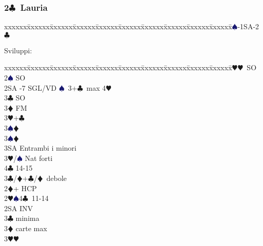 \documentclass[a4paper,italian]{article}
\newcommand{\BC}{\textcolor{OliveGreen}{$\clubsuit$}}
\newcommand{\BD}{\textcolor{RedOrange}{$\vardiamondsuit$}}
\newcommand{\BH}{\textcolor{Red2}{$\varheartsuit${}}}
\newcommand{\BS}{\textcolor{MidnightBlue}{$\spadesuit${}}}
\newcommand{\pdfc}{\texorpdfstring{\BC{}}{C}}
\newenvironment{bidtable}
{\begin{tabbing}

    xxxxxx\=xxxxxx\=xxxxxx\=xxxxxx\=xxxxxx\=xxxxxx\=xxxxxx\=xxxxxx\=xxxxxx\=xxxxxx\=\kill}
{\end{tabbing} }%
\begin{document}
\begin{multicols}{2}
                                        \subsubsection{2\pdfc\ Lauria}
                                        \begin{bidtable}
                                            1\BS-1SA-2\BC
                                        \end{bidtable}

                                        Sviluppi:

                                        \begin{bidtable}
                                            2\BH {}\BH\ SO\\
                                            2\BS \> SO\\
                                            2SA -7 SGL/VD \BS\ 3+\BC\ max 4\BH \+\\
                                            3\BC \> SO\\
                                            3\BD \> FM\+\\
                                            3\BH {}+\BC \+\\
                                            3\BS {}\BD \-\\
                                            3\BS {}\BD \\
                                            3SA \> Entrambi i minori\-\\
                                            3\BH/\BS \> Nat forti\\
                                            4\BC {} 14-15\-\\
                                            3\BC/\BD {}+\BC /\BD\ debole\\
                                            2\BD {}+ HCP\+\\
                                            2\BH {}\BS 4\BC\ 11-14\+\\
                                            2SA \> INV\+\\
                                            3\BC {} minima\\
                                            3\BD {} carte max\\
                                            3\BH {}\BH \\

\end{bidtable}
\end{multicols}
\end{document}
